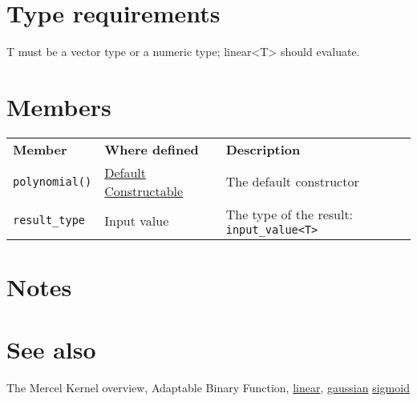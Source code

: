 \documentclass{article}
\begin{document}
\section*{Type requirements}

T must be a vector type or a numeric type; linear<T> should evaluate.


\section*{Members}

\begin{tabular}{lll}
\textbf{Member} & \textbf{Where defined} & \textbf{Description} \\ 
\texttt{polynomial()} & \href{http://www.sgi.com/tech/stl/DefaultConstructible.html}{Default Constructable} & The default constructor \\
\texttt{result_type} & Input value & The type of the result: \texttt{input_value<T>} \\
\end{tabular}

\section*{Notes}

\section*{See also}

The Mercel Kernel overview, Adaptable Binary Function,
\href{research/kml/documentation/linear.html}{linear}, 
\href{research/kml/documentation/gaussian.html}{gaussian}
\href{research/kml/documentation/sigmoid.html}{sigmoid}




\end{document}
